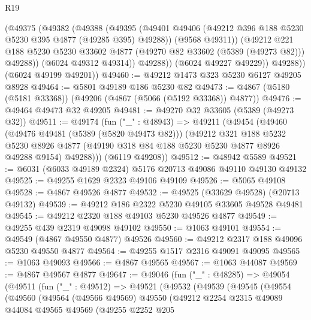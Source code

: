 \begin{lexlean}{R19}
\begin{coremodule}
              (@49375
                (@49382
                  (@49388
                    (@49395
                      (@49401 @49406 (@49212 @396 @188 @5230 @5230 @395 @4877 (@49285 @395) @49288))
                      (@9568 @49311))
                    (@49212
                      @221
                      @188
                      @5230
                      @5230
                      @33602
                      @4877
                      (@49270 @82 @33602 (@5389 (@49273 @82)))
                      @49288))
                  (@6024 @49312 @49314))
                @49288))
            (@6024 @49227 @49229))
          @49288))
      (@6024 @49199 @49201))
@49460 := @49212 @1473 @323 @5230 @6127 @49205 @8928
@49464 := @5801 @49189 @186 @5230 @82
@49473 := @4867 (@5180 (@5181 @33368)) (@49206 (@4867 (@5066 (@5192 @33368)) @4877))
@49476 := @49464 @49473 @32 @49205
@49481 := @49270 @32 @33605 (@5389 (@49273 @32))
@49511 := @49174
    (fun ("_" : @48943) =>
    @49211
      (@49454
        (@49460
          (@49476 @49481 (@5389 (@5820 @49473 @82)))
          (@49212
            @321
            @188
            @5232
            @5230
            @8926
            @4877
            (@49190 @318 @84 @188 @5230 @5230 @4877 @8926 @49288 @9154)
            @49288)))
      (@6119 @49208))
@49512 := @48942 @5589
@49521 := @6031 (@6033 @49189 @2324) @5176 @20713 @49086 @49110 @49130 @49132
@49525 := @49255 @1629 @2323 @49106 @49109
@49526 := @5065 @49108
@49528 := @4867 @49526 @4877
@49532 := @49525 (@33629 @49528) (@20713 @49132)
@49539 := @49212 @186 @2322 @5230 @49105 @33605 @49528 @49481
@49545 := @49212 @2320 @188 @49103 @5230 @49526 @4877
@49549 := @49255 @439 @2319 @49098 @49102
@49550 := @1063 @49101
@49554 := @49549 (@4867 @49550 @4877) @49526
@49560 := @49212 @2317 @188 @49096 @5230 @49550 @4877
@49564 := @49255 @1517 @2316 @49091 @49095
@49565 := @1063 @49093
@49566 := @4867 @49565
@49567 := @1063 @44087
@49569 := @4867 @49567 @4877
@49647 := @49046
    (fun ("_" : @48285) =>
    @49054
      (@49511
        (fun ("_" : @49512) =>
        @49521
          (@49532
            (@49539
              (@49545
                (@49554
                  (@49560
                    (@49564
                      (@49566 @49569)
                      @49550
                      (@49212
                        @2254
                        @2315
                        @49089
                        @44084
                        @49565
                        @49569
                        (@49255
                          @2252
                          @205

\end{coremodule}
\end{lexlean}

